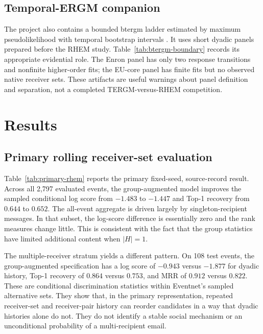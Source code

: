 \documentclass[11pt]{article}
\begin{document}
\subsection{Temporal-ERGM companion}

The project also contains a bounded btergm ladder estimated by maximum pseudolikelihood with temporal bootstrap intervals \citep{leifeldEtAl2018}. It uses short dyadic panels prepared before the RHEM study. Table~\ref{tab:btergm-boundary} records its appropriate evidential role. The Enron panel has only two response transitions and nonfinite higher-order fits; the EU-core panel has finite fits but no observed native receiver sets. These artifacts are useful warnings about panel definition and separation, not a completed TERGM-versus-RHEM competition.

\section{Results}\label{sec:results}

\subsection{Primary rolling receiver-set evaluation}

Table~\ref{tab:primary-rhem} reports the primary fixed-seed, source-record result. Across all 2,797 evaluated events, the group-augmented model improves the sampled conditional log score from $-1.483$ to $-1.447$ and Top-1 recovery from $0.644$ to $0.652$. The all-event aggregate is driven largely by singleton-recipient messages. In that subset, the log-score difference is essentially zero and the rank measures change little. This is consistent with the fact that the group statistics have limited additional content when $|H|=1$.

The multiple-receiver stratum yields a different pattern. On 108 test events, the group-augmented specification has a log score of $-0.943$ versus $-1.877$ for dyadic history, Top-1 recovery of $0.864$ versus $0.753$, and MRR of $0.912$ versus $0.822$. These are conditional discrimination statistics within Eventnet's sampled alternative sets. They show that, in the primary representation, repeated receiver-set and receiver-pair history can reorder candidates in a way that dyadic histories alone do not. They do not identify a stable social mechanism or an unconditional probability of a multi-recipient email.


\end{document}
